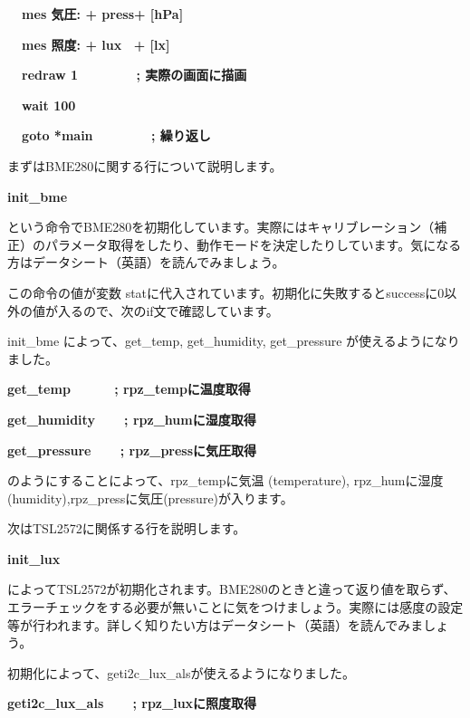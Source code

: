 \documentclass[a4paper,dvipdfmx]{jarticle}
\begin{document}
{\ttfamily\bfseries
\ \ mes {\textquotedbl}気圧: {\textquotedbl} + press+ {\textquotedbl} [hPa]{\textquotedbl}}

{\ttfamily\bfseries
\ \ mes {\textquotedbl}照度: {\textquotedbl} + lux \ + {\textquotedbl} [lx]{\textquotedbl}}


\bigskip

{\ttfamily\bfseries
\ \ redraw 1\ \ \ \ \ \ \ \ \textcolor[rgb]{0.0,0.0,0.8}{; 実際の画面に描画}}

{\ttfamily\bfseries
\ \ wait 100}

{\ttfamily\bfseries
\ \ goto *main\ \ \ \ \ \ \ \ \textcolor[rgb]{0.0,0.0,0.8}{; 繰り返し}}


\bigskip

まずはBME280に関する行について説明します。

{\ttfamily\bfseries
init\_bme}

という命令でBME280を初期化しています。実際にはキャリブレーション（補正）のパラメータ取得をしたり、動作モードを決定したりしています。気になる方はデータシート（英語）を読んでみましょう。

この命令の値が変数
statに代入されています。初期化に失敗するとsuccessに0以外の値が入るので、次のif文で確認しています。

init\_bme によって、get\_temp, get\_humidity, get\_pressure
が使えるようになりました。

{\ttfamily\bfseries\color{black}
get\_temp\ \ \ \ \ \ ; rpz\_tempに温度取得}

{\ttfamily\bfseries\color{black}
get\_humidity\ \ \ \ ; rpz\_humに湿度取得}

{\ttfamily\bfseries\color{black}
get\_pressure\ \ \ \ ; rpz\_pressに気圧取得}


\bigskip

のようにすることによって、rpz\_tempに気温
(temperature),
rpz\_humに湿度(humidity),rpz\_pressに気圧(pressure)が入ります。

次はTSL2572に関係する行を説明します。

{\ttfamily\bfseries
init\_lux}

によってTSL2572が初期化されます。BME280のときと違って返り値を取らず、エラーチェックをする必要が無いことに気をつけましょう。実際には感度の設定等が行われます。詳しく知りたい方はデータシート（英語）を読んでみましょう。

初期化によって、geti2c\_lux\_alsが使えるようになりました。


{\ttfamily\bfseries\color{black}
geti2c\_lux\_als\ \ \ \ ; rpz\_luxに照度取得}
\end{document}

